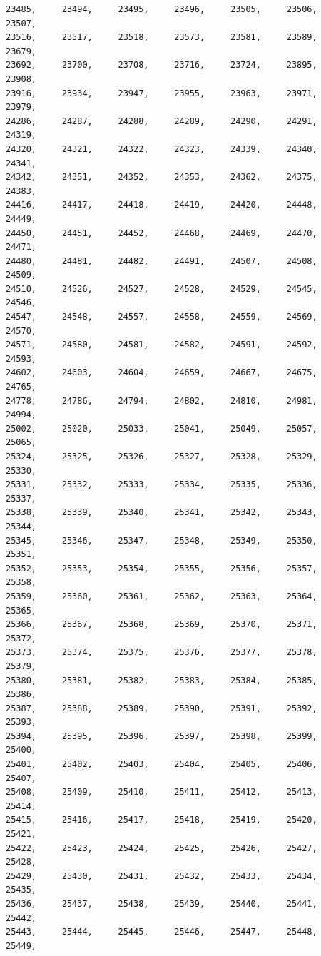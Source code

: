 \documentclass[a4paper,11pt]{report}
\begin{document}
\begin{verbatim}
23485,     23494,     23495,     23496,     23505,     23506,     23507,     
23516,     23517,     23518,     23573,     23581,     23589,     23679,     
23692,     23700,     23708,     23716,     23724,     23895,     23908,     
23916,     23934,     23947,     23955,     23963,     23971,     23979,     
24286,     24287,     24288,     24289,     24290,     24291,     24319,     
24320,     24321,     24322,     24323,     24339,     24340,     24341,     
24342,     24351,     24352,     24353,     24362,     24375,     24383,     
24416,     24417,     24418,     24419,     24420,     24448,     24449,     
24450,     24451,     24452,     24468,     24469,     24470,     24471,     
24480,     24481,     24482,     24491,     24507,     24508,     24509,     
24510,     24526,     24527,     24528,     24529,     24545,     24546,     
24547,     24548,     24557,     24558,     24559,     24569,     24570,     
24571,     24580,     24581,     24582,     24591,     24592,     24593,     
24602,     24603,     24604,     24659,     24667,     24675,     24765,     
24778,     24786,     24794,     24802,     24810,     24981,     24994,     
25002,     25020,     25033,     25041,     25049,     25057,     25065,     
25324,     25325,     25326,     25327,     25328,     25329,     25330,     
25331,     25332,     25333,     25334,     25335,     25336,     25337,     
25338,     25339,     25340,     25341,     25342,     25343,     25344,     
25345,     25346,     25347,     25348,     25349,     25350,     25351,     
25352,     25353,     25354,     25355,     25356,     25357,     25358,     
25359,     25360,     25361,     25362,     25363,     25364,     25365,     
25366,     25367,     25368,     25369,     25370,     25371,     25372,     
25373,     25374,     25375,     25376,     25377,     25378,     25379,     
25380,     25381,     25382,     25383,     25384,     25385,     25386,     
25387,     25388,     25389,     25390,     25391,     25392,     25393,     
25394,     25395,     25396,     25397,     25398,     25399,     25400,     
25401,     25402,     25403,     25404,     25405,     25406,     25407,     
25408,     25409,     25410,     25411,     25412,     25413,     25414,     
25415,     25416,     25417,     25418,     25419,     25420,     25421,     
25422,     25423,     25424,     25425,     25426,     25427,     25428,     
25429,     25430,     25431,     25432,     25433,     25434,     25435,     
25436,     25437,     25438,     25439,     25440,     25441,     25442,     
25443,     25444,     25445,     25446,     25447,     25448,     25449,     

\end{verbatim}
\end{document}
